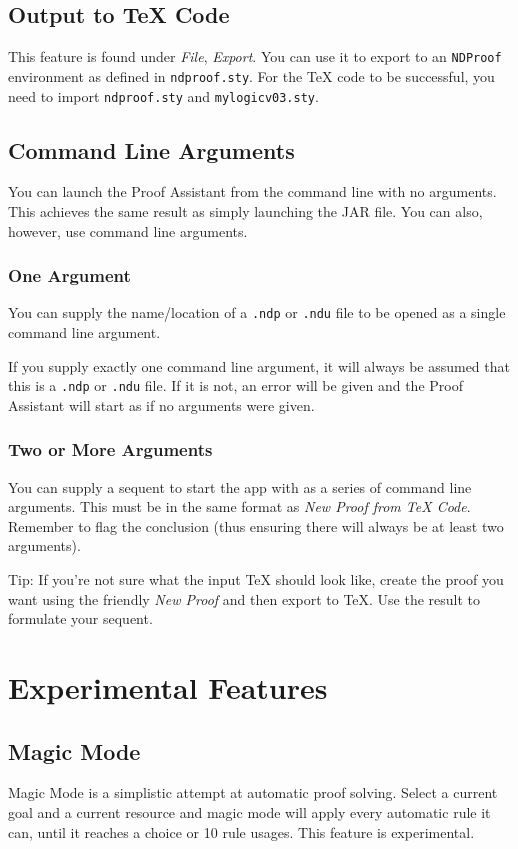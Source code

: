 \documentclass[a4paper]{article}
\begin{document}
\subsection{Output to {\TeX} Code}
This feature is found under \emph{File}, \emph{Export}. You can use it to export to an \texttt{NDProof} environment as defined in \texttt{ndproof.sty}. For the {\TeX} code to be successful, you need to import \texttt{ndproof.sty} and \texttt{mylogicv03.sty}.

\subsection{Command Line Arguments}
You can launch the Proof Assistant from the command line with no arguments. This achieves the same result as simply launching the JAR file. You can also, however, use command line arguments.

\subsubsection{One Argument}
You can supply the name/location of a \texttt{.ndp} or \texttt{.ndu} file to be opened as a single command line argument.

If you supply exactly one command line argument, it will always be assumed that this is a \texttt{.ndp} or \texttt{.ndu} file. If it is not, an error will be given and the Proof Assistant will start as if no arguments were given.

\subsubsection{Two or More Arguments}
You can supply a sequent to start the app with as a series of command line arguments. This must be in the same format as \emph{New Proof from {\TeX} Code}. Remember to flag the conclusion (thus ensuring there will always be at least two arguments).

Tip: If you're not sure what the input {\TeX} should look like, create the proof you want using the friendly \emph{New Proof} and then export to {\TeX}. Use the result to formulate your sequent.


\section{Experimental Features}

\subsection{Magic Mode}
Magic Mode is a simplistic attempt at automatic proof solving. Select a current goal and a current resource and magic mode will apply every automatic rule it can, until it reaches a choice or 10 rule usages. This feature is experimental.

\printindex
\end{document}

